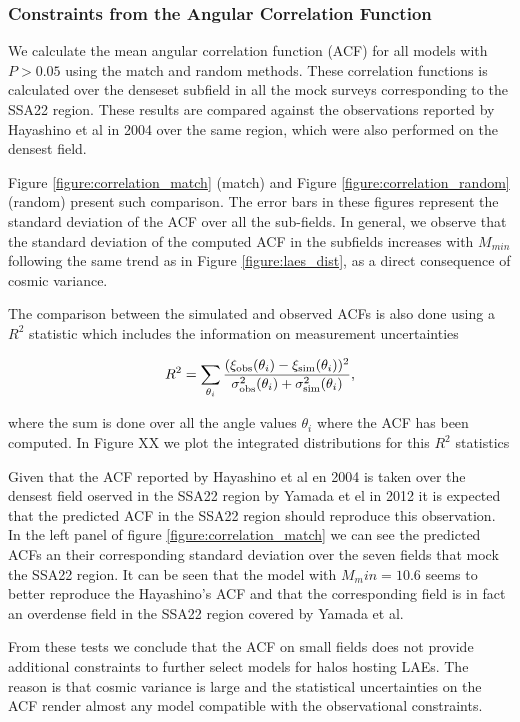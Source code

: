 \documentclass[usenatbib]{mn2e}
\begin{document}
\subsubsection{Constraints from the Angular Correlation Function}

We calculate the mean angular correlation function (ACF) for all
models with $P>0.05$ using the match and random methods. These
correlation functions is calculated over the denseset subfield in all the
mock surveys corresponding to the SSA22 region. These results are
compared against the observations reported by Hayashino et al in 2004
over the same region, which were also performed on the densest field.  

Figure \ref{figure:correlation_match} (match) and Figure
\ref{figure:correlation_random} (random) present such comparison.  The
error bars in these figures represent the standard deviation of the
ACF over all the sub-fields.  In general, we observe that the standard
deviation of the computed ACF in the subfields increases with
$M_{min}$ following the same trend as in Figure
\ref{figure:laes_dist}, as a direct consequence of cosmic variance.  


The comparison between the simulated and observed ACFs is also done using a
$R^2$ statistic which includes the information on measurement uncertainties

\begin{equation}
R^{2} = \sum_{\theta_i} \frac{(\xi_{\rm obs}(\theta_i) - \xi_{\rm
    sim}(\theta_i))^2}{\sigma_{\rm obs}^2(\theta_i) + \sigma_{\rm
    sim}^2({\theta_i})}, 
\end{equation}

where the sum is done over all the angle values $\theta_i$ where the
ACF has been computed. In Figure XX we plot the integrated
distributions for this $R^{2}$ statistics 

Given that the ACF reported by Hayashino et al en 2004 is taken over
the densest  field oserved in the SSA22 region by  Yamada et el in
2012 it is expected that the predicted ACF in the SSA22 region should
reproduce this observation. In the  left panel of figure
\ref{figure:correlation_match} we can see the predicted ACFs  an their
corresponding standard deviation over the seven fields that mock the
SSA22  region. It can be seen that the model with $M_min=10.6$ seems
to better reproduce the  Hayashino's ACF and that the corresponding
field is in fact an overdense field in the SSA22 region covered by
Yamada et al. 

From these tests we conclude that the ACF on small fields does not
provide additional constraints to further select models for halos
hosting LAEs. The reason is that cosmic variance is large and the
statistical uncertainties on the ACF render almost any model
compatible with the observational constraints. 
\end{document}
